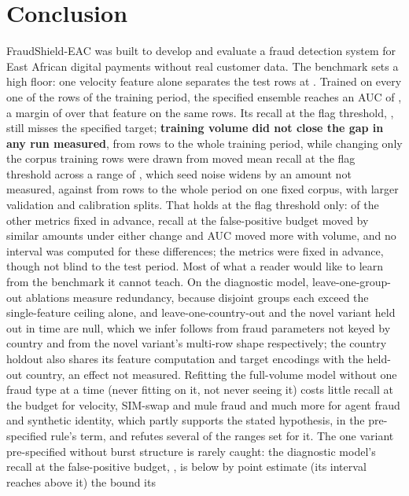 \section{Conclusion}
\label{sec:conclusion}

FraudShield-EAC was built to develop and evaluate a fraud detection system for East African digital
payments without real customer data. The benchmark sets a high floor: one velocity feature alone
separates the test rows at \nGateFloor{}. Trained on every one of the \nFvTrainRows{} rows of the
training period, the specified ensemble reaches an AUC of \nFvAUC{}, a margin of \nFvMargin{} over that
feature on the same rows. Its recall at the flag threshold, \nFvRecallSix{} \nFvRecallSixci{}, still
misses the specified target; \textbf{training volume did not close the gap in any run measured}, from
\nTrainUsed{} rows to the whole training period, while changing only the corpus \nTrainUsed{} training rows
were drawn from moved mean recall at the flag threshold across a range of \nSelMeanRange{}, which seed noise widens
by an amount not measured, against
\nFvSeedGainFixed{} from \nTrainUsed{} rows to the whole period on one fixed corpus, with larger validation and calibration splits. That holds at the
flag threshold only: of the other metrics fixed in advance, recall at the false-positive budget moved
by similar amounts under either change and AUC moved more with volume, and no interval was computed for
these differences; the metrics were fixed in advance, though not blind to the test period. Most of what a reader would like to learn
from the benchmark it cannot teach. On the diagnostic model, leave-one-group-out ablations measure
redundancy, because \nGroupsAboveCeiling{} disjoint groups each exceed the single-feature ceiling
alone, and leave-one-country-out and the novel variant held out in time are null, which we infer follows from fraud
parameters not keyed by country and from the novel variant's multi-row shape respectively; the country
holdout also shares its feature computation and target encodings with the held-out country, an effect
not measured. Refitting the full-volume model without one fraud type at a time (never fitting on it,
not never seeing it) costs little recall at the \nFPRBudget{} budget for velocity, SIM-swap and mule
fraud and much more for agent fraud and synthetic identity, which partly supports the stated hypothesis, in the pre-specified rule's term, and refutes several of the
ranges set for it. The one variant pre-specified without burst structure is rarely caught: the diagnostic model's
recall at the \nFPRBudget{} false-positive budget, \nRevRecall{}, is below by point estimate (its interval reaches above it) the bound its
